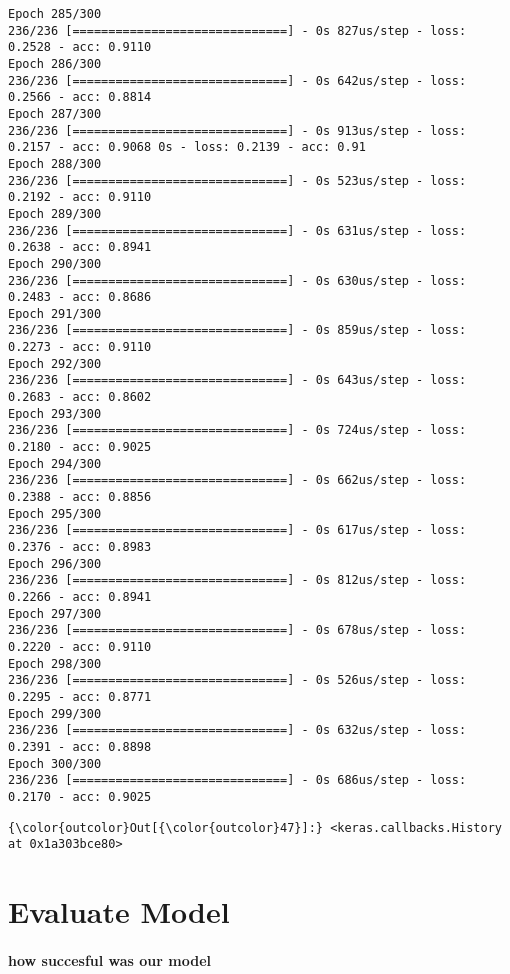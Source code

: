 \documentclass[11pt]{article}
\begin{document}
\begin{Verbatim}[commandchars=\\\{\}]
Epoch 285/300
236/236 [==============================] - 0s 827us/step - loss: 0.2528 - acc: 0.9110
Epoch 286/300
236/236 [==============================] - 0s 642us/step - loss: 0.2566 - acc: 0.8814
Epoch 287/300
236/236 [==============================] - 0s 913us/step - loss: 0.2157 - acc: 0.9068 0s - loss: 0.2139 - acc: 0.91
Epoch 288/300
236/236 [==============================] - 0s 523us/step - loss: 0.2192 - acc: 0.9110
Epoch 289/300
236/236 [==============================] - 0s 631us/step - loss: 0.2638 - acc: 0.8941
Epoch 290/300
236/236 [==============================] - 0s 630us/step - loss: 0.2483 - acc: 0.8686
Epoch 291/300
236/236 [==============================] - 0s 859us/step - loss: 0.2273 - acc: 0.9110
Epoch 292/300
236/236 [==============================] - 0s 643us/step - loss: 0.2683 - acc: 0.8602
Epoch 293/300
236/236 [==============================] - 0s 724us/step - loss: 0.2180 - acc: 0.9025
Epoch 294/300
236/236 [==============================] - 0s 662us/step - loss: 0.2388 - acc: 0.8856
Epoch 295/300
236/236 [==============================] - 0s 617us/step - loss: 0.2376 - acc: 0.8983
Epoch 296/300
236/236 [==============================] - 0s 812us/step - loss: 0.2266 - acc: 0.8941
Epoch 297/300
236/236 [==============================] - 0s 678us/step - loss: 0.2220 - acc: 0.9110
Epoch 298/300
236/236 [==============================] - 0s 526us/step - loss: 0.2295 - acc: 0.8771
Epoch 299/300
236/236 [==============================] - 0s 632us/step - loss: 0.2391 - acc: 0.8898
Epoch 300/300
236/236 [==============================] - 0s 686us/step - loss: 0.2170 - acc: 0.9025

    \end{Verbatim}

\begin{Verbatim}[commandchars=\\\{\}]
{\color{outcolor}Out[{\color{outcolor}47}]:} <keras.callbacks.History at 0x1a303bce80>
\end{Verbatim}
            
    \section{Evaluate Model}\label{evaluate-model}

\paragraph{how succesful was our
model}\label{how-succesful-was-our-model}
\end{document}
